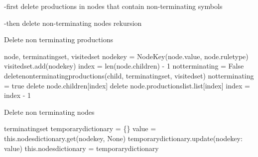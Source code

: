 -first delete productions in nodes that contain non-terminating symbols

-then delete non-terminating nodes
rekursion
\begin{algorithm}[H]
\caption{Delete non terminating productions}
\begin{algorithmic}[1] 
\Require node, terminating\textunderscore set, visited\textunderscore set
\State node\textunderscore key = Node\textunderscore Key(node.value, node.rule\textunderscore type)
	\State visited\textunderscore set.add(node\textunderscore key)
	\State index = len(node.children) - 1
		\State not\textunderscore terminating = False
			\State delete\textunderscore non\textunderscore terminating\textunderscore productions(child, terminating\textunderscore set, visited\textunderscore set)
				\State not\textunderscore terminating = true
			\EndIf
		\EndFor
			\State delete node.children[index]
			\State delete node.productions\textunderscore list.list[index]
		\EndIf
		\State index = index - 1
\EndFor
\EndIf
\end{algorithmic}
\label{alg:delete_non_terminating_productions}
\end{algorithm}

\begin{algorithm}[H]
\caption{Delete non terminating nodes}
\begin{algorithmic}[1] 
\Require terminating\textunderscore set
\State temporary\textunderscore dictionary = \{\}
	\State value = this.nodes\textunderscore dictionary.get(node\textunderscore key, None)
	\State temporary\textunderscore dictionary.update({node\textunderscore key: value})
	\State this.nodes\textunderscore dictionary = temporary\textunderscore dictionary
\EndFor
\end{algorithmic}
\end{algorithm}
